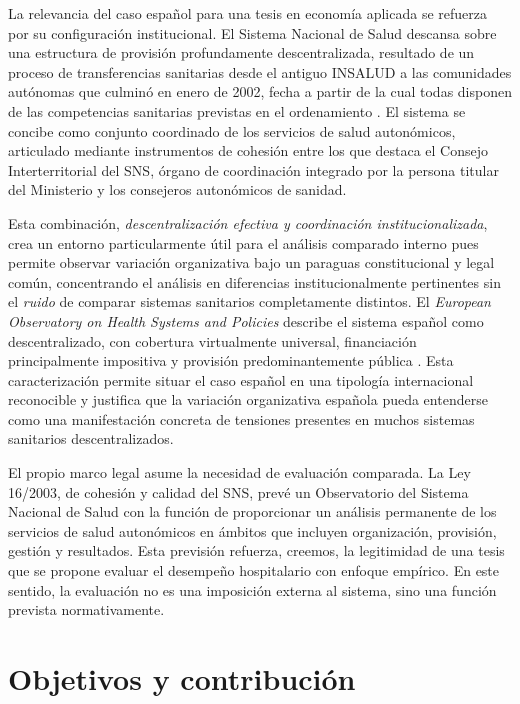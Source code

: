 La relevancia del caso español para una tesis en economía aplicada se refuerza por su configuración institucional. El Sistema Nacional de Salud descansa sobre una estructura de 
provisión profundamente descentralizada, resultado de un proceso de transferencias sanitarias desde el antiguo INSALUD a las comunidades autónomas que culminó en enero de 2002, fecha a partir de la cual todas  disponen de las competencias sanitarias previstas en el ordenamiento \citep{observatorioHIT2024}. El sistema se concibe como conjunto coordinado de los servicios de salud autonómicos, articulado mediante instrumentos de cohesión entre los que destaca el Consejo Interterritorial del SNS, órgano de coordinación integrado por la persona titular del Ministerio y los consejeros autonómicos de sanidad.

Esta combinación, \emph{descentralización efectiva y coordinación institucionalizada}, crea un entorno particularmente útil para el análisis comparado interno pues permite observar variación organizativa bajo un paraguas constitucional y legal común, concentrando el análisis en diferencias institucionalmente pertinentes sin el \textit{ruido} de comparar sistemas sanitarios completamente distintos. El \textit{European Observatory on Health Systems and Policies} describe el sistema español como descentralizado, con cobertura virtualmente universal, financiación principalmente impositiva y provisión predominantemente pública \citep{observatorioHIT2024}. Esta caracterización  permite situar el caso español en una tipología internacional reconocible y justifica que la variación organizativa española pueda entenderse como una manifestación concreta de tensiones presentes en muchos sistemas sanitarios descentralizados.

El propio marco legal asume la necesidad de evaluación comparada. La Ley 16/2003, de cohesión y calidad del SNS, prevé un Observatorio del Sistema Nacional de Salud con la función de proporcionar un análisis permanente de los servicios de salud autonómicos en ámbitos que incluyen organización, provisión, gestión y resultados. Esta previsión refuerza, creemos, la legitimidad de una tesis que se propone evaluar el desempeño hospitalario con enfoque empírico. En este sentido, la evaluación no es una imposición externa al sistema, sino una función prevista normativamente.

\section{Objetivos y contribución}

